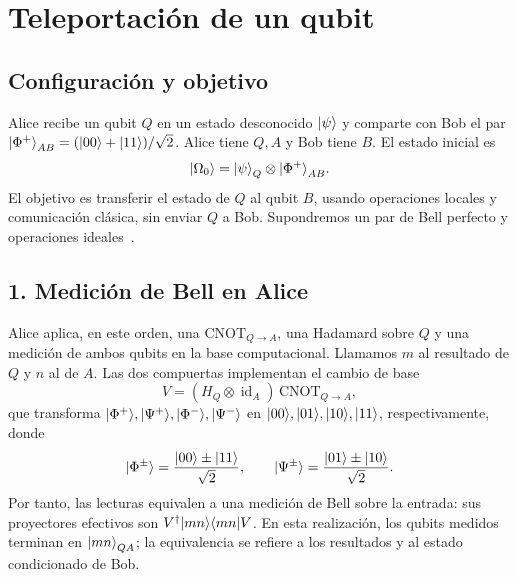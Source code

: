 \documentclass[letterpaper,12pt]{article}
\DeclareMathOperator{\id}{id}
\numberwithin{equation}{section}
\begin{document}
\section{Teleportación de un qubit}

\subsection*{Configuración y objetivo}
Alice recibe un qubit $Q$ en un estado desconocido ${\vert \psi \rangle}$ y comparte
con Bob el par ${\vert \Phi^+ \rangle}_{AB}=({\vert 00 \rangle}+{\vert 11 \rangle})/\sqrt2$.
Alice tiene $Q,A$ y Bob tiene $B$. El estado inicial es
\[
  {\vert \Omega_0 \rangle}={\vert \psi \rangle}_Q\otimes{\vert \Phi^+ \rangle}_{AB}.
\]
El objetivo es transferir el estado de $Q$ al qubit $B$, usando operaciones
locales y comunicación clásica, sin enviar $Q$ a Bob. Supondremos un par
de Bell perfecto y operaciones ideales~\cite{bennett1993teleportation}.

\subsection*{1. Medición de Bell en Alice}
Alice aplica, en este orden, una $\mathrm{CNOT}_{Q\to A}$, una Hadamard
sobre $Q$ y una medición de ambos qubits en la base computacional.
Llamamos $m$ al resultado de $Q$ y $n$ al de $A$.
Las dos compuertas implementan el cambio de base
\[
  V=(H_Q\otimes\id_A)\,\mathrm{CNOT}_{Q\to A},
\]
que transforma ${\vert \Phi^+ \rangle},{\vert \Psi^+ \rangle},{\vert \Phi^- \rangle},{\vert \Psi^- \rangle}$
en ${\vert 00 \rangle},{\vert 01 \rangle},{\vert 10 \rangle},{\vert 11 \rangle}$, respectivamente, donde
\[
  {\vert \Phi^\pm \rangle}=\frac{{\vert 00 \rangle}\pm{\vert 11 \rangle}}{\sqrt2},
  \qquad
  {\vert \Psi^\pm \rangle}=\frac{{\vert 01 \rangle}\pm{\vert 10 \rangle}}{\sqrt2}.
\]
Por tanto, las lecturas equivalen a una medición de Bell sobre la entrada:
sus proyectores efectivos son $V^\dagger{\vert mn \rangle \langle mn \vert}V$.
En esta realización, los qubits medidos terminan en ${\vert mn \rangle}_{QA}$;
la equivalencia se refiere a los resultados y al estado condicionado de Bob.
\end{document}
